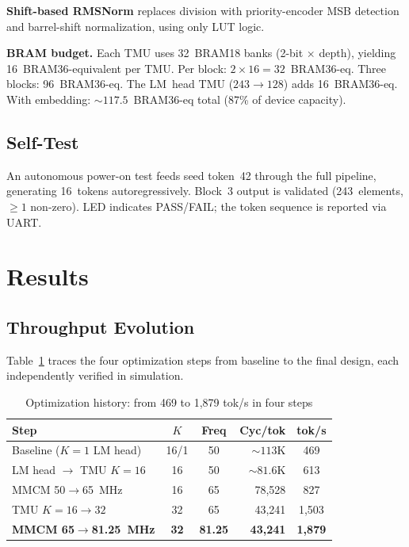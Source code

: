 \documentclass[conference]{IEEEtran}
\begin{document}
\textbf{Shift-based RMSNorm} replaces division with priority-encoder MSB
detection and barrel-shift normalization, using only LUT logic.

\textbf{BRAM budget.}  Each TMU uses 32~BRAM18 banks (2-bit $\times$ depth),
yielding 16~BRAM36-equivalent per TMU.  Per block: $2 \times 16 = 32$~BRAM36-eq.
Three blocks: 96~BRAM36-eq.  The LM~head TMU ($243\!\to\!128$) adds 16~BRAM36-eq.
With embedding: ${\sim}117.5$~BRAM36-eq total (87\% of device capacity).

\subsection{Self-Test}

An autonomous power-on test feeds seed token~42 through the full pipeline,
generating 16~tokens autoregressively.  Block~3 output is validated
(243~elements, $\ge 1$ non-zero).  LED indicates PASS/FAIL; the token sequence
is reported via UART.

\section{Results}

\subsection{Throughput Evolution}

Table~\ref{tab:evolution} traces the four optimization steps from baseline
to the final design, each independently verified in simulation.

\begin{table}[t]
\centering
\caption{Optimization history: from 469 to 1,879 tok/s in four steps}
\label{tab:evolution}
\begin{tabular}{@{}lccrc@{}}
\toprule
\textbf{Step} & \textbf{$K$} & \textbf{Freq} & \textbf{Cyc/tok} & \textbf{tok/s} \\
\midrule
Baseline ($K\!=\!1$ LM head) & 16/1 & 50 & ${\sim}113$K & 469 \\
LM head $\to$ TMU $K\!=\!16$ & 16 & 50 & ${\sim}81.6$K & 613 \\
MMCM 50$\to$65~MHz            & 16 & 65 & 78,528 & 827 \\
TMU $K\!=\!16 \to 32$         & 32 & 65 & 43,241 & 1,503 \\
\textbf{MMCM 65$\to$81.25~MHz} & \textbf{32} & \textbf{81.25} & \textbf{43,241} & \textbf{1,879} \\
\bottomrule
\end{tabular}
\end{table}
\end{document}
